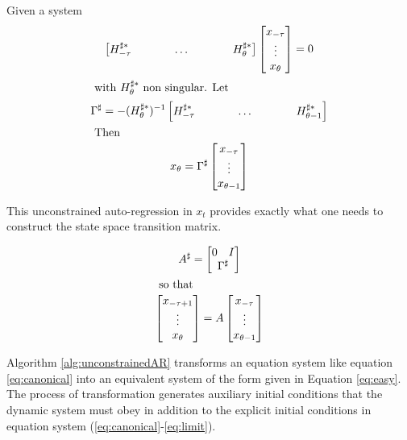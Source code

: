 \documentclass{article}
\newcommand{\hsh}{H^{\sharp\ast}_{-\tau}&\hspace{0.25in}&\dots&\hspace{0.25in}&H^{\sharp\ast}_{\theta}}
\newcommand{\hshShort}{H^{\sharp\ast}_{-\tau}&\hspace{0.25in}&\dots&\hspace{0.25in}&H^{\sharp\ast}_{\theta-1}}
\begin{document}
{Given a system 
\begin{gather}
  \begin{bmatrix}
    \hsh
  \end{bmatrix} 
  \begin{bmatrix}
    x_{-\tau}\\ \vdots \\x_{\theta}
  \end{bmatrix} =0\nonumber \\ \intertext{ with $H^{\sharp\ast}_{\theta}$ non singular. Let} \label{eq:easy}
\Gamma^\sharp=- (H^{\sharp\ast}_{\theta})^{-1}\begin{bmatrix}
    \hshShort
  \end{bmatrix} \\ \intertext{ Then }
x_{\theta} = 
 \Gamma^\sharp
  \begin{bmatrix}
    x_{-\tau}\\ \vdots \\x_{\theta-1}
  \end{bmatrix}  \nonumber
\end{gather}

This unconstrained auto-regression in $x_t$ provides exactly what one needs to
construct the state space transition matrix. 



\begin{gather*}
A^\sharp= 
\begin{bmatrix}
  \begin{matrix}
    0&I
  \end{matrix}\\ \Gamma^\sharp
\end{bmatrix}\\ \intertext{ so that }
  \begin{bmatrix}
    x_{-\tau+1}\\ \vdots \\x_{\theta}
  \end{bmatrix}  = A
  \begin{bmatrix}
    x_{-\tau}\\ \vdots \\x_{\theta-1}
  \end{bmatrix} 
\end{gather*}

Algorithm \ref{alg:unconstrainedAR} transforms an equation system like equation \ref{eq:canonical} into an equivalent system of the form given in Equation \ref{eq:easy}. The process of transformation
generates auxiliary initial conditions that the dynamic system must obey
in addition to the explicit initial conditions in equation system (\ref{eq:canonical}-\ref{eq:limit}).


}
\end{document}
